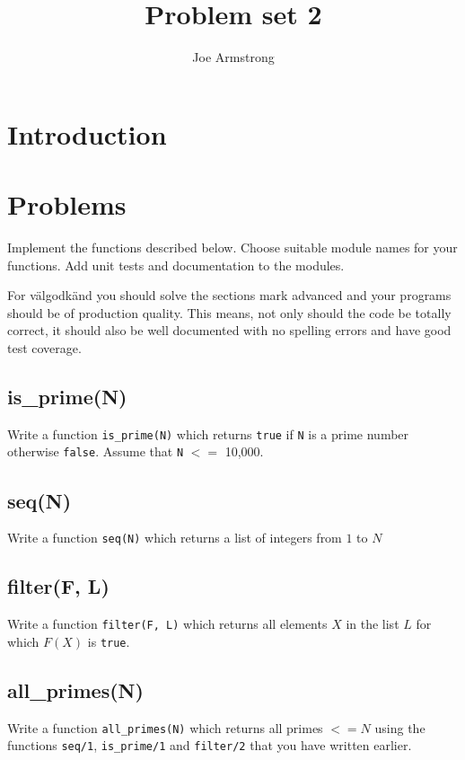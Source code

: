 \documentclass[12pt]{hitec}
\title{Problem set 2}
\author{Joe Armstrong}
\date{}
\begin{document}
\maketitle

\tableofcontents

\section{Introduction}

\section{Problems}

Implement the functions described below. Choose suitable module names
for your functions. Add unit tests and documentation to the modules.

For v\"{a}lgodk\"{a}nd you should solve the sections mark advanced and
your programs should be of production quality. This means, not only
should the code be totally correct, it should also be well documented
with no spelling errors and have good test coverage.


\subsection{is\_prime(N)}

Write a function \verb+is_prime(N)+ which returns \verb+true+ if
\verb+N+ is a prime number otherwise \verb+false+. Assume that
\verb+N+ $<=$ 10,000.

\subsection{seq(N)}
Write a function \verb+seq(N)+ which returns a list of integers from
$1$ to $N$

\subsection{filter(F, L)}

Write a function \verb+filter(F, L)+ which returns all elements $X$ in
the list $L$ for which $F(X)$ is \verb+true+.

\subsection {all\_primes(N)}

Write a function \verb+all_primes(N)+ which returns
all primes $<= N$ using the functions \verb+seq/1+,
\verb+is_prime/1+ and \verb+filter/2+ that you have written earlier.
\end{document}
